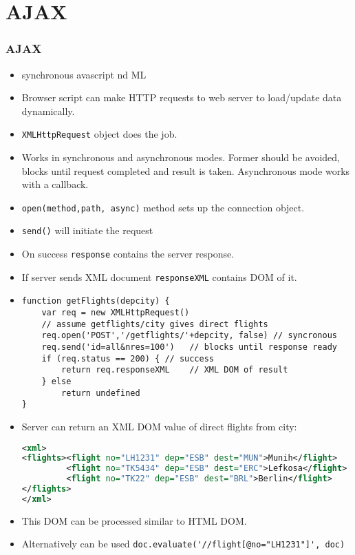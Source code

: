 \documentclass[trans,compress,xcolor=table]{beamer}
\begin{document}
\section{AJAX}
\begin{frame}
\frametitle{AJAX}
\begin{itemize}
\item {}synchronous avascript nd ML 
\item Browser script can make HTTP requests to web server to 
load/update data dynamically.
\item \lstinline!XMLHttpRequest! object does the job.
\item Works in synchronous and asynchronous modes. Former should be avoided, blocks until request completed and result is taken. Asynchronous mode works with a callback.
\item \lstinline!open(method,path, async)! method sets up the connection object.
\item \lstinline!send()! will initiate the request
\item On success \lstinline!response! contains the server response.
\item If server sends XML document \lstinline!responseXML! contains DOM of it.
\end{itemize}
\end{frame}

\begin{frame}[fragile]
\begin{itemize}
\item
\begin{lstlisting}
function getFlights(depcity) {
    var req = new XMLHttpRequest()
    // assume getflights/city gives direct flights
    req.open('POST','/getflights/'+depcity, false) // syncronous
    req.send('id=all&nres=100')	  // blocks until response ready
    if (req.status == 200) { // success
        return req.responseXML    // XML DOM of result
    } else 
        return undefined
}
\end{lstlisting}
\item Server can return an XML DOM value of direct flights from city:
\begin{lstlisting}[language=XML]
<xml>
<flights><flight no="LH1231" dep="ESB" dest="MUN">Munih</flight>
         <flight no="TK5434" dep="ESB" dest="ERC">Lefkosa</flight>
         <flight no="TK22" dep="ESB" dest="BRL">Berlin</flight>
</flights>
</xml>
\end{lstlisting}
\item This DOM can be processed similar to HTML DOM.
\item Alternatively  can be used \lstinline!doc.evaluate('//flight[@no="LH1231"]', doc)!
\end{itemize}
\end{frame}
\end{document}
